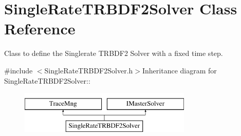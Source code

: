 \hypertarget{classSingleRateTRBDF2Solver}{
\section{SingleRateTRBDF2Solver Class Reference}
\label{classSingleRateTRBDF2Solver}
}


Class to define the Singlerate TRBDF2 Solver with a fixed time step.  


{\ttfamily \#include $<$SingleRateTRBDF2Solver.h$>$}Inheritance diagram for SingleRateTRBDF2Solver::\begin{figure}[H]
\begin{center}
\leavevmode
\includegraphics[height=2cm]{classSingleRateTRBDF2Solver}
\end{center}
\end{figure}
